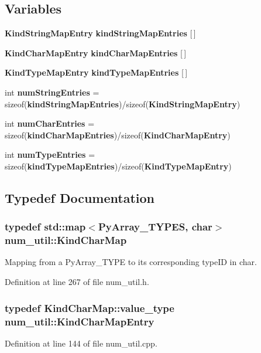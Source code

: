 \subsection*{Variables}
\begin{CompactItemize}
\item 
{\bf Kind\-String\-Map\-Entry} {\bf kind\-String\-Map\-Entries} [$\,$]
\item 
{\bf Kind\-Char\-Map\-Entry} {\bf kind\-Char\-Map\-Entries} [$\,$]
\item 
{\bf Kind\-Type\-Map\-Entry} {\bf kind\-Type\-Map\-Entries} [$\,$]
\item 
int {\bf num\-String\-Entries} = sizeof({\bf kind\-String\-Map\-Entries})/sizeof({\bf Kind\-String\-Map\-Entry})
\item 
int {\bf num\-Char\-Entries} = sizeof({\bf kind\-Char\-Map\-Entries})/sizeof({\bf Kind\-Char\-Map\-Entry})
\item 
int {\bf num\-Type\-Entries} = sizeof({\bf kind\-Type\-Map\-Entries})/sizeof({\bf Kind\-Type\-Map\-Entry})
\end{CompactItemize}


\subsection{Typedef Documentation}
\subsubsection{\setlength{\rightskip}{0pt plus 5cm}typedef std::map$<$Py\-Array\_\-TYPES, char$>$ {\bf num\_\-util::Kind\-Char\-Map}}\label{namespacenum__util_a10}


Mapping from a Py\-Array\_\-TYPE to its corresponding type\-ID in char.

Definition at line 267 of file num\_\-util.h.
\subsubsection{\setlength{\rightskip}{0pt plus 5cm}typedef Kind\-Char\-Map::value\_\-type {\bf num\_\-util::Kind\-Char\-Map\-Entry}}\label{namespacenum__util_a2}




Definition at line 144 of file num\_\-util.cpp.
